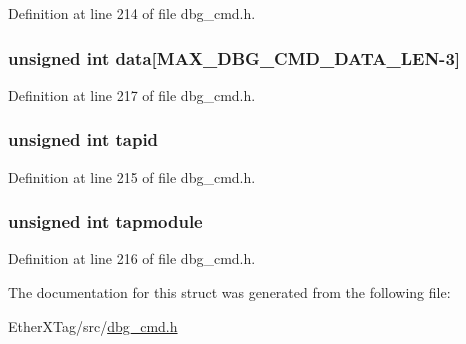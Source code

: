 Definition at line 214 of file dbg\-\_\-cmd.\-h.

\hypertarget{structdbg__cmd__type__write__jtag__reg_a728dc245dc576de10147524d6a701ef3}{
\subsubsection[{data}]{\setlength{\rightskip}{0pt plus 5cm}unsigned int data\mbox{[}{\bf M\-A\-X\-\_\-\-D\-B\-G\-\_\-\-C\-M\-D\-\_\-\-D\-A\-T\-A\-\_\-\-L\-E\-N}-\/3\mbox{]}}}\label{structdbg__cmd__type__write__jtag__reg_a728dc245dc576de10147524d6a701ef3}


Definition at line 217 of file dbg\-\_\-cmd.\-h.

\hypertarget{structdbg__cmd__type__write__jtag__reg_ab45a32c579f91cd302a98e9f3000e245}{
\subsubsection[{tapid}]{\setlength{\rightskip}{0pt plus 5cm}unsigned int tapid}}\label{structdbg__cmd__type__write__jtag__reg_ab45a32c579f91cd302a98e9f3000e245}


Definition at line 215 of file dbg\-\_\-cmd.\-h.

\hypertarget{structdbg__cmd__type__write__jtag__reg_a81cc17fe846b9d6fa02f6ebccb89a542}{
\subsubsection[{tapmodule}]{\setlength{\rightskip}{0pt plus 5cm}unsigned int tapmodule}}\label{structdbg__cmd__type__write__jtag__reg_a81cc17fe846b9d6fa02f6ebccb89a542}


Definition at line 216 of file dbg\-\_\-cmd.\-h.



The documentation for this struct was generated from the following file\-:\begin{DoxyCompactItemize}
\item 
Ether\-X\-Tag/src/\hyperlink{dbg__cmd_8h}{dbg\-\_\-cmd.\-h}\end{DoxyCompactItemize}
